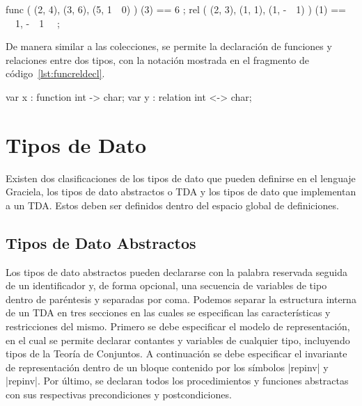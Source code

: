 \begin{gracielacode}[caption=Evaluación de \textit{función} y \textit{relación}, label=lst:funcreleval]
{ func ({ (2, 4), (3, 6), (5, 1~~0) }) (3) == 6 };
{ rel  ({ (2, 3), (1, 1), (1, -~~1) }) (1) == {~~1, -~~1~~} };
\end{gracielacode}

De manera similar a las colecciones, se permite la declaración de funciones y
relaciones entre dos tipos, con la notación mostrada en el fragmento de
código~\ref{lst:funcreldecl}.

\begin{gracielacode}[caption=Declaración de variables de tipos \textit{función} y \textit{relación}, label=lst:funcreldecl]
var x : function int  -> char;
var y : relation int <-> char;
\end{gracielacode}

\section{Tipos de Dato}

Existen dos clasificaciones de los tipos de dato que pueden definirse en el
lenguaje Graciela, los tipos de dato abstractos o TDA y los tipos de dato que
implementan a un TDA. Estos deben ser definidos dentro del espacio global de
definiciones.

\subsection{Tipos de Dato Abstractos}

Los tipos de dato abstractos pueden declararse con la palabra reservada
 seguida de un identificador y, de forma opcional, una secuencia
de variables de tipo dentro de paréntesis y separadas por coma. Podemos separar
la estructura interna de un TDA en tres secciones en las cuales se especifican
las características y restricciones del mismo. Primero se debe especificar el
modelo de representación, en el cual se permite declarar contantes y variables
de cualquier tipo, incluyendo tipos de la Teoría de Conjuntos. A continuación se
debe especificar el invariante de representación dentro de un bloque contenido
por los símbolos \ingra|{repinv| y \ingra|repinv}|. Por último, se declaran
todos los procedimientos y funciones abstractas con sus respectivas
precondiciones y postcondiciones.

